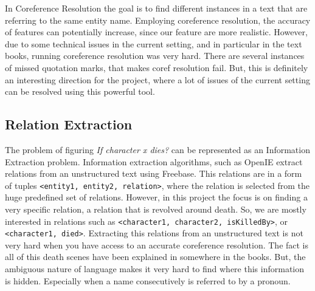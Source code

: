 \documentclass[letterpaper]{article}
\begin{document}
In Coreference Resolution the goal is to find different instances in a text that are referring to the same entity name. Employing coreference resolution, the accuracy of features can potentially increase, since our feature are more realistic. However, due to some technical issues in the current setting, and in particular in the text books, running coreference resolution was very hard. There are several instances of missed quotation marks, that makes coref resolution fail. But, this is definitely an interesting direction for the project, where a lot of issues of the current setting can be resolved using this powerful tool.



\subsection{Relation Extraction}
The problem of figuring \textit{If character x dies?} can be represented as an Information Extraction problem. Information extraction algorithms, such as OpenIE extract relations from an unstructured text using Freebase. This relations are in a form of tuples \texttt{<entity1, entity2, relation>}, where the relation is selected from the huge predefined set of relations. However, in this project the focus is on finding a very specific relation, a relation that is revolved around death. So, we are mostly interested in relations such as \texttt{<character1, character2, isKilledBy>}, or \texttt{<character1, died>}. Extracting this relations from an unstructured text is not very hard when you have access to an accurate coreference resolution. The fact is all of this death scenes have been explained in somewhere in the books. But, the ambiguous nature of language makes it very hard to find where this information is hidden. Especially when a name consecutively is referred to by a pronoun.



\end{document}
